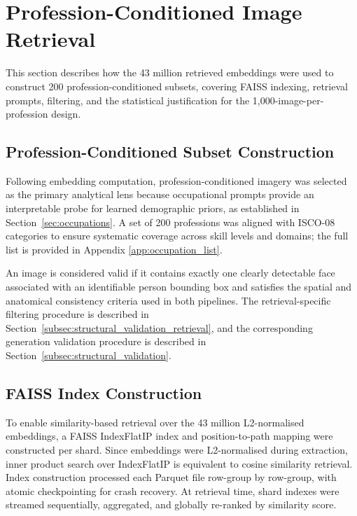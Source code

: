 \section{Profession-Conditioned Image Retrieval}
\label{sec:profession_retrieval}

This section describes how the 43 million retrieved embeddings were used to construct 200 profession-conditioned subsets, covering FAISS indexing, retrieval prompts, filtering, and the statistical justification for the 1,000-image-per-profession design.

\subsection{Profession-Conditioned Subset Construction}
\label{subsec:profession_subset_construction}

Following embedding computation, profession-conditioned imagery was selected as the primary analytical lens because occupational prompts provide an interpretable probe for learned demographic priors, as established in Section~\ref{sec:occupations}. A set of 200 professions was aligned with ISCO-08 categories to ensure systematic coverage across skill levels and domains; the full list is provided in Appendix \ref{app:occupation_list}.

An image is considered valid if it contains exactly one clearly detectable face associated with an identifiable person bounding box and satisfies the spatial and anatomical consistency criteria used in both pipelines. The retrieval-specific filtering procedure is described in Section~\ref{subsec:structural_validation_retrieval}, and the corresponding generation validation procedure is described in Section~\ref{subsec:structural_validation}.


\subsection{FAISS Index Construction}
\label{subsec:faiss_index}

To enable similarity-based retrieval over the 43 million L2-normalised embeddings, a FAISS IndexFlatIP index and position-to-path mapping were constructed per shard. Since embeddings were L2-normalised during extraction, inner product search over IndexFlatIP is equivalent to cosine similarity retrieval. Index construction processed each Parquet file row-group by row-group, with atomic checkpointing for crash recovery. At retrieval time, shard indexes were streamed sequentially, aggregated, and globally re-ranked by similarity score.

